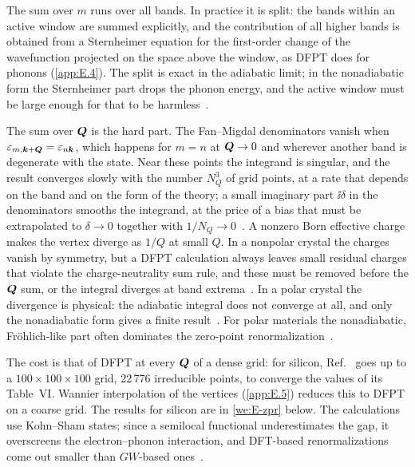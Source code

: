 The sum over $m$ runs over all bands. In practice it is split: the bands within an active window are summed explicitly, and the contribution of all higher bands is obtained from a Sternheimer equation for the first-order change of the wavefunction projected on the space above the window, as DFPT does for phonons (\cref{app:E.4}). The split is exact in the adiabatic limit; in the nonadiabatic form the Sternheimer part drops the phonon energy, and the active window must be large enough for that to be harmless~\cite[below Eq.~(16)]{ponce2015temperature}.

The sum over $\bm{Q}$ is the hard part. The Fan--Migdal denominators vanish when $\varepsilon_{m,\bm{k}+\bm{Q}} = \varepsilon_{n\bm{k}}$, which happens for $m = n$ at $\bm{Q} \to 0$ and wherever another band is degenerate with the state. Near these points the integrand is singular, and the result converges slowly with the number $N_Q^3$ of grid points, at a rate that depends on the band and on the form of the theory; a small imaginary part $\ii\delta$ in the denominators smooths the integrand, at the price of a bias that must be extrapolated to $\delta \to 0$ together with $1/N_Q \to 0$~\cite[Sect.~III and Table~II]{ponce2015temperature}. A nonzero Born effective charge makes the vertex diverge as $1/Q$ at small $Q$. In a nonpolar crystal the charges vanish by symmetry, but a DFPT calculation always leaves small residual charges that violate the charge-neutrality sum rule, and these must be removed before the $\bm{Q}$ sum, or the integral diverges at band extrema~\cite[Sect.~III]{ponce2015temperature}. In a polar crystal the divergence is physical: the adiabatic integral does not converge at all, and only the nonadiabatic form gives a finite result~\cite{ponce2015temperature}. For polar materials the nonadiabatic, Fröhlich-like part often dominates the zero-point renormalization~\cite{miglio2020predominance}.

The cost is that of DFPT at every $\bm{Q}$ of a dense grid: for silicon, Ref.~\cite{ponce2015temperature} goes up to a $100\times100\times100$ grid, 22\,776 irreducible points, to converge the values of its Table~VI. Wannier interpolation of the vertices (\cref{app:E.5}) reduces this to DFPT on a coarse grid. The results for silicon are in \cref{we:E-zpr} below. The calculations use Kohn--Sham states; since a semilocal functional underestimates the gap, it overscreens the electron--phonon interaction, and DFT-based renormalizations come out smaller than $GW$-based ones~\cite[Sect.~VII\,B]{zacharias2020theory}.

